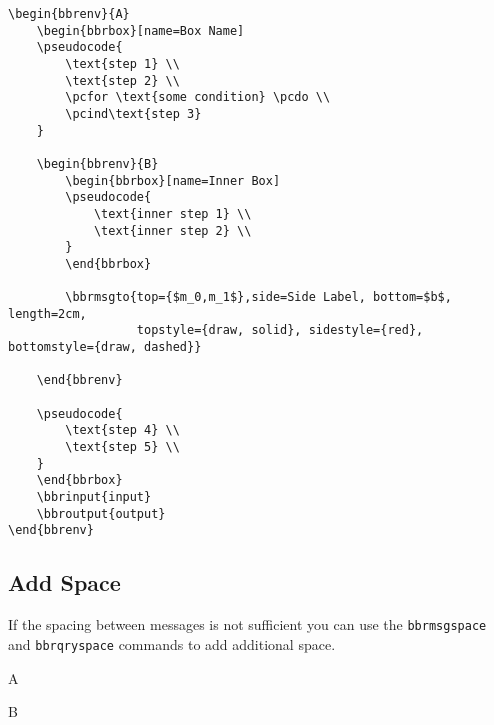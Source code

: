 \documentclass[a4paper]{report}
\begin{document}
\begin{lstlisting}
\begin{bbrenv}{A}
	\begin{bbrbox}[name=Box Name]
	\pseudocode{
		\text{step 1} \\
		\text{step 2} \\
		\pcfor \text{some condition} \pcdo \\
		\pcind\text{step 3} 
	}

	\begin{bbrenv}{B}
		\begin{bbrbox}[name=Inner Box]
		\pseudocode{
			\text{inner step 1} \\
			\text{inner step 2} \\
		}
		\end{bbrbox}
		
		\bbrmsgto{top={$m_0,m_1$},side=Side Label, bottom=$b$, length=2cm,
				  topstyle={draw, solid}, sidestyle={red}, bottomstyle={draw, dashed}}

	\end{bbrenv}

	\pseudocode{
		\text{step 4} \\
		\text{step 5} \\
	}
	\end{bbrbox}
	\bbrinput{input}
	\bbroutput{output}
\end{bbrenv}
\end{lstlisting}


\subsection{Add Space}
If the spacing between messages is not sufficient you can use the \lstinline$bbrmsgspace$ and
\lstinline$bbrqryspace$ commands to add additional space.
\begin{bbrenv}{A}
	\begin{bbrbox}[name=Reduction]

	\begin{bbrenv}{B}

		\begin{bbrbox}[name=Adversary,minheight=3cm,xshift=4cm]

		\end{bbrbox}
		
		\bbrmsgspace{1.5cm}

		\bbrqryspace{1cm}

	\end{bbrenv}

	\end{bbrbox}
\end{bbrenv}
\end{document}

